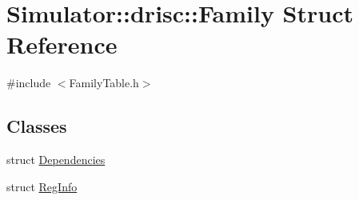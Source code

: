 \hypertarget{struct_simulator_1_1drisc_1_1_family}{\section{Simulator\+:\+:drisc\+:\+:Family Struct Reference}
\label{struct_simulator_1_1drisc_1_1_family}
}


{\ttfamily \#include $<$Family\+Table.\+h$>$}

\subsection*{Classes}
\begin{DoxyCompactItemize}
\item 
struct \hyperlink{struct_simulator_1_1drisc_1_1_family_1_1_dependencies}{Dependencies}
\item 
struct \hyperlink{struct_simulator_1_1drisc_1_1_family_1_1_reg_info}{Reg\+Info}
\end{DoxyCompactItemize}
